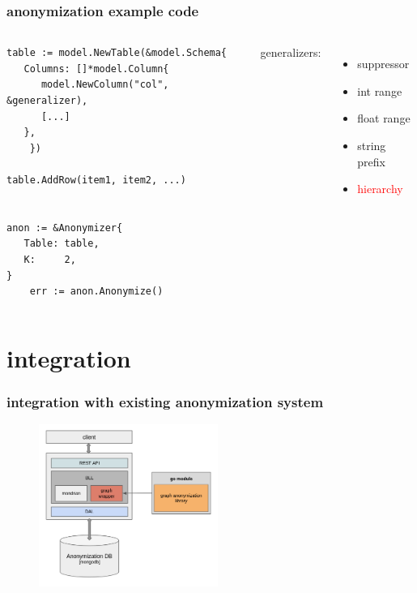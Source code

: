 \documentclass{beamer}
\begin{document}
\begin{frame}[fragile]
  \frametitle{anonymization example code}
  \begin{columns}
  \scriptsize
  \begin{verbatim}
table := model.NewTable(&model.Schema{
   Columns: []*model.Column{
      model.NewColumn("col", &generalizer),
      [...]
   },
	})
	
table.AddRow(item1, item2, ...)


anon := &Anonymizer{
   Table: table,
   K:     2,
}
	err := anon.Anonymize()
  \end{verbatim}
  generalizers:
  \begin{itemize}
    \item suppressor
    \item int range
    \item float range
    \item string prefix
    \item \textcolor{red}{hierarchy}
  \end{itemize}
  \end{columns}
\end{frame}

\section{integration}
\begin{frame}
  \frametitle{integration with existing anonymization system}
  \begin{figure}[h!]
  \begin{center}
  \includegraphics[height=200px]{../images/components.png}
  \end{center}
  \end{figure}
\end{frame}
\end{document}
